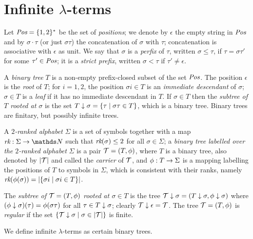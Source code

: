 \section{Infinite $\lambda$-terms}\label{sec:infinite-terms}

Let $\textit{Pos} = \{ 1, 2 \}^*$ be the set of {\em positions}; 
we denote by $\epsilon$ the empty string in $\textit{Pos}$ 
and by $\sigma\cdot\tau$ (or just $\sigma\tau$) the concatenation of $\sigma$ with
$\tau$; concatenation is associative with  $\epsilon$ as unit. We say that $\sigma$ is a {\em perfix} of $\tau$,
written $\sigma \leq \tau$, if $\tau = \sigma \tau'$ for some 
$\tau' \in \textit{Pos}$; it is a {\em strict prefix}, written $\sigma < \tau$
if $\tau' \neq \epsilon$.

A {\em binary tree} $T$ is a non-empty prefix-closed subset of the set
$\textit{Pos}$. The position $\epsilon$ is the {\em root} of $T$; 
for $i = 1,2$, the position $\sigma i \in T$ is an {\em immediate descendant} of $\sigma$;
$\sigma \in T$ is a {\em leaf} if it has no immediate descendant in $T$. 
If $\sigma \in T$ then the {\em subtree of $T$ rooted at $\sigma$} is the set 
$T \downarrow \sigma = \{ \tau \mid \sigma \tau \in T \}$, which is
a binary tree. Binary trees are finitary, but possibly infinite trees. %

A {\em $2$-ranked alphabet}
$\Sigma$ is a set of symbols together with a map $\rank:\Sigma \to \nat$
such that $\textit{rk}(\sigma) \leq 2$ for all $\sigma \in \Sigma$; a {\em binary tree labelled over
the $2$-ranked alphabet} $\Sigma$ is a pair $\BTree = (T, \phi)$, where $T$ is a binary tree, 
also denoted by $|\BTree|$  and called the {\em carrier} of $\BTree$, and
$\phi : T \to \Sigma$ is a mapping labelling the positions of $T$ to symbols in $\Sigma$, 
which is consistent with their ranks,
namely $\textit{rk}(\phi(\sigma)) = |\{ \sigma i \mid \sigma i \in T \}|$.

The {\em subtree of $\BTree = (T, \LabelFun)$ rooted at $\sigma \in T$} is the tree 
$\SubTree{\BTree}{\sigma} = (\SubTree{T}{\sigma}, \SubTree{\LabelFun}{\sigma})$
where $(\phi \downarrow \sigma) (\tau) = \phi(\sigma \tau)$ for all
$\tau \in T \downarrow \sigma$; clearly $\SubTree{\BTree}{\epsilon} = \BTree$.
The tree $\BTree = (T, \LabelFun)$ is {\em regular}
if the set $\set{\SubTree{\BTree}{\sigma} \mid \sigma \in |\BTree|}$ is finite.

We define infinite $\lambda$-terms as certain binary trees.
\medskip

